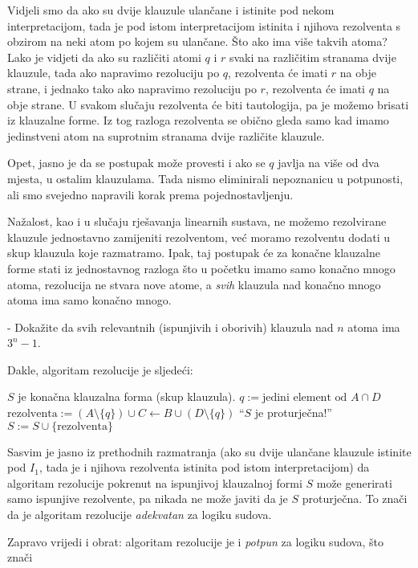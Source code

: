 Vidjeli smo da ako su dvije klauzule ulančane i istinite pod nekom interpretacijom, tada je pod istom interpretacijom istinita i njihova rezolventa s obzirom na neki atom po kojem su ulančane. Što ako ima više takvih atoma? Lako je vidjeti da ako su različiti atomi $q$ i $r$ svaki na različitim stranama dvije klauzule, tada ako napravimo rezoluciju po $q$, rezolventa će imati $r$ na obje strane, i jednako tako ako napravimo rezoluciju po $r$, rezolventa će imati $q$ na obje strane. U svakom slučaju rezolventa će biti tautologija, pa je možemo brisati iz klauzalne forme. Iz tog razloga rezolventa se obično gleda samo kad imamo jedinstveni atom na suprotnim stranama dvije različite klauzule.

Opet, jasno je da se postupak može provesti i ako se $q$ javlja na više od dva mjesta, u ostalim klauzulama. Tada nismo eliminirali nepoznanicu u potpunosti, ali smo svejedno napravili korak prema pojednostavljenju.

Nažalost, kao i u slučaju rješavanja linearnih sustava, ne možemo rezolvirane klauzule jednostavno zamijeniti rezolventom, već moramo rezolventu dodati u skup klauzula koje razmatramo. Ipak, taj postupak će za konačne klauzalne forme stati iz jednostavnog razloga što u početku imamo samo konačno mnogo atoma, rezolucija ne stvara nove atome, a \emph{svih} klauzula nad konačno mnogo atoma ima samo konačno mnogo.

\begin{zadatak}-
	Dokažite da svih relevantnih (ispunjivih i oborivih) klauzula nad $n$ atoma ima $3^n-1$.
\end{zadatak}

Dakle, algoritam rezolucije je sljedeći:

\begin{algorithmic}
	\Require $S$ je konačna klauzalna forma (skup klauzula).
			\State $q:=\mbox{jedini element od }A\cap D$
			\State $\mbox{rezolventa}:=(A\setminus\{q\})\cup C\leftarrow B\cup(D\setminus\{q\})$
				\Return \enquote{$S$ je proturječna!}
			\EndIf
			\State $S:=S\cup \{\mbox{rezolventa}\}$
		\EndIf
	\EndFor
\end{algorithmic}

Sasvim je jasno iz prethodnih razmatranja (ako su dvije ulančane klauzule istinite pod $I_1$, tada je i njihova rezolventa istinita pod istom interpretacijom) da algoritam rezolucije pokrenut na ispunjivoj klauzalnoj formi $S$ može generirati samo ispunjive rezolvente, pa nikada ne može javiti da je $S$ proturječna. To znači da je algoritam rezolucije \emph{adekvatan} za logiku sudova.

Zapravo vrijedi i obrat: algoritam rezolucije je i \emph{potpun} za logiku sudova, što znači 